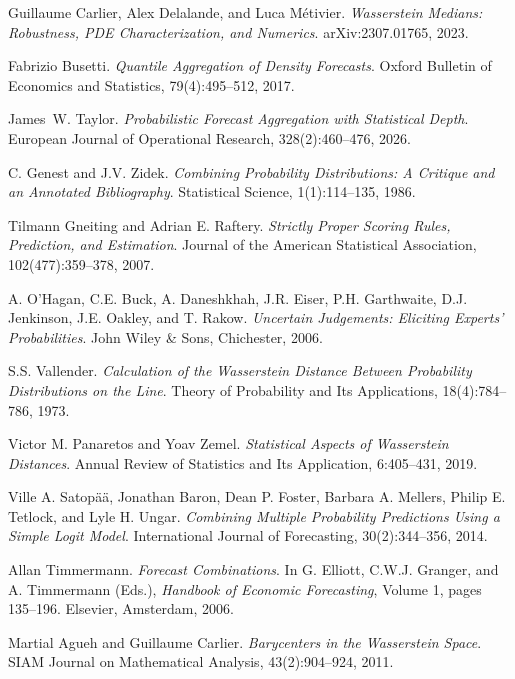 Guillaume Carlier, Alex Delalande, and Luca M{\'e}tivier.
\textit{Wasserstein Medians: Robustness, {PDE} Characterization, and Numerics}.
arXiv:2307.01765, 2023.

Fabrizio Busetti.
\textit{Quantile Aggregation of Density Forecasts}.
Oxford Bulletin of Economics and Statistics, 79(4):495--512, 2017.

James~W. Taylor.
\textit{Probabilistic Forecast Aggregation with Statistical Depth}.
European Journal of Operational Research, 328(2):460--476, 2026.

C. Genest and J.V. Zidek.
\textit{Combining Probability Distributions: A Critique and an Annotated Bibliography}.
Statistical Science, 1(1):114--135, 1986.

Tilmann Gneiting and Adrian E. Raftery.
\textit{Strictly Proper Scoring Rules, Prediction, and Estimation}.
Journal of the American Statistical Association, 102(477):359--378, 2007.

A. O'Hagan, C.E. Buck, A. Daneshkhah, J.R. Eiser, P.H. Garthwaite,
D.J. Jenkinson, J.E. Oakley, and T. Rakow.
\textit{Uncertain Judgements: Eliciting Experts' Probabilities}.
John Wiley \& Sons, Chichester, 2006.

S.S. Vallender.
\textit{Calculation of the Wasserstein Distance Between Probability Distributions on the Line}.
Theory of Probability and Its Applications, 18(4):784--786, 1973.

Victor M. Panaretos and Yoav Zemel.
\textit{Statistical Aspects of Wasserstein Distances}.
Annual Review of Statistics and Its Application, 6:405--431, 2019.

Ville A. Satop{\"a}{\"a}, Jonathan Baron, Dean P. Foster, Barbara A. Mellers,
Philip E. Tetlock, and Lyle H. Ungar.
\textit{Combining Multiple Probability Predictions Using a Simple Logit Model}.
International Journal of Forecasting, 30(2):344--356, 2014.

Allan Timmermann.
\textit{Forecast Combinations}.
In G. Elliott, C.W.J. Granger, and A. Timmermann (Eds.),
\textit{Handbook of Economic Forecasting}, Volume 1, pages 135--196.
Elsevier, Amsterdam, 2006.

Martial Agueh and Guillaume Carlier.
\textit{Barycenters in the Wasserstein Space}.
SIAM Journal on Mathematical Analysis, 43(2):904--924, 2011.

